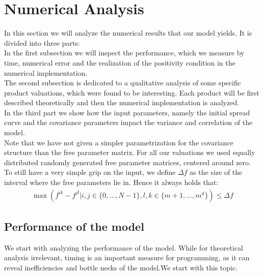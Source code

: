 \documentclass[12pt]{article}
\begin{document}
	\section{Numerical Analysis}
	In this section we will analyze the numerical results that our model yields. It is divided into three parts:\\
	In the first subsection we will inspect the performance, which we measure by time, numerical error and the realization of the positivity condition in the numerical implementation.\\
	The second subsection is dedicated to a qualitative analysis of some specific product valuations, which were found to be interesting. Each product will be first described theoretically and then the numerical implementation is analyzed.\\
	In the third part we show how the input parameters, namely the initial spread curve and the covariance parameters impact the variance and correlation of the model.\\
	Note that we have not given a simpler parametrization for the covariance structure than the free parameter matrix. For all our valuations we used equally distributed randomly generated free parameter matrices, centered around zero.
	To still have a very simple grip on the input, we define $\Delta f$ as the size of the interval where the free parameters lie in. Hence it always holds that:
	\begin{align*}
		\max\left(f^{i k} - f^{j l} | i,j \in\{0,...,N-1\}, l,k\in\{m+1,...,m^d\}\right) \le \Delta f
	\end{align*}
	
	\subsection{Performance of the model}
	We start with analyzing the performance of the model. While for theoretical analysis irrelevant, timing is an important measure for programming, as it can reveal inefficiencies and bottle necks of the model.We start with this topic.
\end{document}
